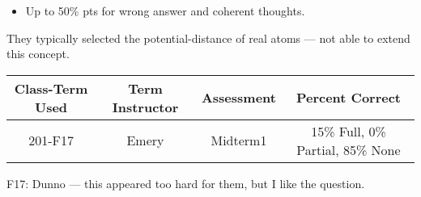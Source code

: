 \begin{rubric}

\begin{itemize}
	\item Up to 50\% pts for wrong answer and coherent thoughts.
\end{itemize}

\end{rubric}

\begin{outcomes}
They typically selected the potential-distance of real atoms --- not able to extend this concept.
	\begin{center}
		\begin{tabular}{cccc}
			\hline\hline
			Class-Term Used & Term Instructor & Assessment & Percent Correct\\
			\hline
			201-F17 & Emery & Midterm1 & 15\% Full, 0\% Partial, 85\% None\\			
			\hline
		\end{tabular}
	\end{center}
\end{outcomes}

\begin{comments}

F17: Dunno --- this appeared too hard for them, but I like the question.
	
\end{comments}
